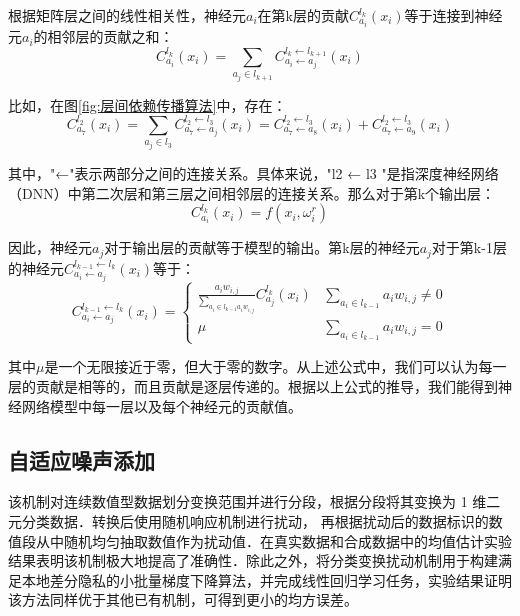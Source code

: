 根据矩阵层之间的线性相关性，神经元$a_{i}$在第k层的贡献$C_{a_{i}}^{l_{k}}\left(x_{i}\right)$等于连接到神经元$a_{i}$的相邻层的贡献之和：
\begin{equation}\label{eq:层间传播1}
C_{a_{i}}^{l_{k}}\left(x_{i}\right)=\sum_{a_{j} \in l_{k+1}} C_{a_{i} \leftarrow a_{j}}^{l_{k} \leftarrow l_{k+1}}\left(x_{i}\right)
\end{equation}

比如，在图\ref{fig:层间依赖传播算法}中，存在：
\begin{equation}\label{eq:层间传播2}
C_{a_{7}}^{l_{2}}\left(x_{i}\right)=\sum_{a_{j} \in l_{3}} C_{a_{7} \leftarrow a_{j}}^{l_{2} \leftarrow l_{3}}\left(x_{i}\right)=C_{a_{7} \leftarrow a_{8}}^{l_{2} \leftarrow l_{3}}\left(x_{i}\right)+C_{a_{7} \leftarrow a_{9}}^{l_{2} \leftarrow l_{3}}\left(x_{i}\right)
\end{equation}

其中，"←"表示两部分之间的连接关系。具体来说，"l2 ← l3 "是指深度神经网络（DNN）中第二次层和第三层之间相邻层的连接关系。那么对于第k个输出层：
\begin{equation}
C_{a_{i}}^{l_{k}}\left(x_{i}\right)=f\left(x_{i}, \omega_{i}^{r}\right)
\end{equation}

因此，神经元$a_{j}$对于输出层的贡献等于模型的输出。第k层的神经元$a_{j}$对于第k-1层的神经元$C_{a_{i} \leftarrow a_{j}}^{l_{k-1} \leftarrow l_{k}}\left(x_{i}\right)$等于：
\begin{equation}
C_{a_{i} \leftarrow a_{j}}^{l_{k-1} \leftarrow l_{k}}\left(x_{i}\right)=\left\{\begin{array}{cc}\frac{a_{i} w_{i, j}}{\sum_{a_{i} \in l_{k-1} a_{i} w_{i, j}}} C_{a_{j}}^{l_{k}}\left(x_{i}\right) & \sum_{a_{i} \in l_{k-1}} a_{i} w_{i, j} \neq 0 \\ \mu & \sum_{a_{i} \in l_{k-1}} a_{i} w_{i, j}=0\end{array}\right.
\end{equation}

其中$\mu$是一个无限接近于零，但大于零的数字。从上述公式中，我们可以认为每一层的贡献是相等的，而且贡献是逐层传递的。根据以上公式的推导，我们能得到神经网络模型中每一层以及每个神经元的贡献值。


\subsection{自适应噪声添加}
该机制对连续数值型数据划分变换范围并进行分段，根据分段将其变换为 1 维二元分类数据．转换后使用随机响应机制进行扰动， 再根据扰动后的数据标识的数值段从中随机均匀抽取数值作为扰动值．在真实数据和合成数据中的均值估计实验结果表明该机制极大地提高了准确性．除此之外，将分类变换扰动机制用于构建满足本地差分隐私的小批量梯度下降算法，并完成线性回归学习任务，实验结果证明该方法同样优于其他已有机制，可得到更小的均方误差。

